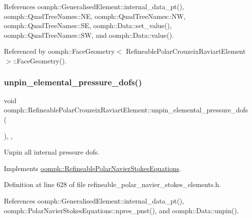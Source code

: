 References oomph\+::\+Generalised\+Element\+::internal\+\_\+data\+\_\+pt(), oomph\+::\+Quad\+Tree\+Names\+::\+NE, oomph\+::\+Quad\+Tree\+Names\+::\+NW, oomph\+::\+Quad\+Tree\+Names\+::\+SE, oomph\+::\+Data\+::set\+\_\+value(), oomph\+::\+Quad\+Tree\+Names\+::\+SW, and oomph\+::\+Data\+::value().



Referenced by oomph\+::\+Face\+Geometry$<$ Refineable\+Polar\+Crouzeix\+Raviart\+Element $>$\+::\+Face\+Geometry().

\mbox{\label{classoomph_1_1RefineablePolarCrouzeixRaviartElement_a672ed3b75ac6408eda52c6789a1c9690}} 
\subsubsection{\texorpdfstring{unpin\+\_\+elemental\+\_\+pressure\+\_\+dofs()}{unpin\_elemental\_pressure\_dofs()}}
{\footnotesize\ttfamily void oomph\+::\+Refineable\+Polar\+Crouzeix\+Raviart\+Element\+::unpin\+\_\+elemental\+\_\+pressure\+\_\+dofs (\begin{DoxyParamCaption}{ }\end{DoxyParamCaption})\hspace{0.3cm}{\ttfamily [inline]}, {\ttfamily [private]}, {\ttfamily [virtual]}}



Unpin all internal pressure dofs. 



Implements \hyperlink{classoomph_1_1RefineablePolarNavierStokesEquations_add592ab49fc813016f9d0d22bc82a68f}{oomph\+::\+Refineable\+Polar\+Navier\+Stokes\+Equations}.



Definition at line 628 of file refineable\+\_\+polar\+\_\+navier\+\_\+stokes\+\_\+elements.\+h.



References oomph\+::\+Generalised\+Element\+::internal\+\_\+data\+\_\+pt(), oomph\+::\+Polar\+Navier\+Stokes\+Equations\+::npres\+\_\+pnst(), and oomph\+::\+Data\+::unpin().

